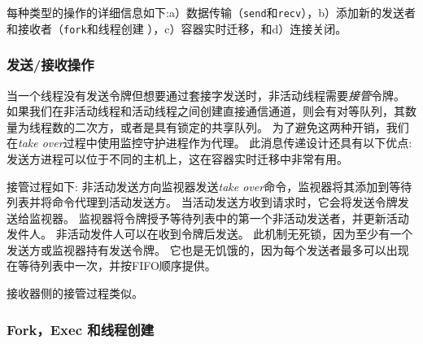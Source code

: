 
每种类型的操作的详细信息如下:a）数据传输（\texttt {send}和\texttt {recv}），b）添加新的发送者和接收者（\texttt {fork}和线程创建 ），c）容器实时迁移，和d）连接关闭。

\subsubsection{发送/接收操作}
\label{socksdirect:subsubsec:fork_rdwr}


当一个线程没有发送令牌但想要通过套接字发送时，非活动线程需要\emph {接管}令牌。
如果我们在非活动线程和活动线程之间创建直接通信通道，则会有对等队列，其数量为线程数的二次方，或者是具有锁定的共享队列。
为了避免这两种开销，我们在\emph {take over}过程中使用监控守护进程作为代理。
此消息传递设计还具有以下优点:发送方进程可以位于不同的主机上，这在容器实时迁移中非常有用。

接管过程如下:
非活动发送方向监视器发送\emph {take over}命令，监视器将其添加到等待列表并将命令代理到活动发送方。
当活动发送方收到请求时，它会将发送令牌发送给监视器。
监视器将令牌授予等待列表中的第一个非活动发送者，并更新活动发件人。
非活动发件人可以在收到令牌后发送。
此机制无死锁，因为至少有一个发送方或监视器持有发送令牌。
它也是无饥饿的，因为每个发送者最多可以出现在等待列表中一次，并按FIFO顺序提供。

接收器侧的接管过程类似。



\subsubsection{Fork，Exec 和线程创建}
\label{socksdirect:subsubsec:fork_fork}


